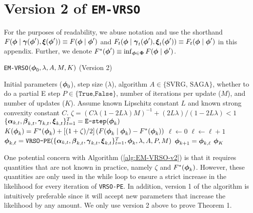 \section{Version 2 of \texttt{EM-VRSO}}

For the purposes of readability, we abuse notation and use the shorthand $F(\boldsymbol{\phi} \mid \boldsymbol{\gamma}(\boldsymbol{\phi}'), \boldsymbol{\xi}(\boldsymbol{\phi}')) \equiv F(\boldsymbol{\phi} \mid \boldsymbol{\phi}')$ and $F_{t}(\boldsymbol{\phi} \mid \boldsymbol{\gamma}_{t}(\boldsymbol{\phi}'), \boldsymbol{\xi}_{t}(\boldsymbol{\phi}')) \equiv F_{t}(\boldsymbol{\phi} \mid \boldsymbol{\phi}')$ in this appendix. Further, we denote $F^*(\boldsymbol{\phi}') \equiv \inf_{\boldsymbol{\phi} \in \boldsymbol{\Phi}} F(\boldsymbol{\phi} \mid \boldsymbol{\phi}')$.

\begin{algorithm}
\caption{\texttt{EM-VRSO}$(\boldsymbol{\phi}_0, \lambda, A, M, K)$ (Version 2)}\label{alg:EM-VRSO-v2}
\begin{algorithmic}[1]
\Require Initial parameters ($\boldsymbol{\phi}_{0}$), step size ($\lambda$), algorithm $A \in \{\text{SVRG, SAGA}\}$, whether to do a partial E step $P \in \{\texttt{True,False}\}$, number of iterations per update ($M$), and number of updates ($K$). Assume known Lipschitz constant $L$ and known strong convexity constant $C$.
%
\vspace{5pt}
%
\State $\zeta = (C \lambda(1-2L\lambda)M)^{-1} + (2L\lambda) / (1-2L\lambda) < 1$ 
%
%
% 
\State $\{\boldsymbol{\alpha}_{k,t},\boldsymbol{\beta}_{k,t},\boldsymbol{\gamma}_{k,t},\boldsymbol{\xi}_{k,t}\}_{t=1}^{T} = \texttt{E-step}(\boldsymbol{\phi}_{k})$ 
%
\State $K(\boldsymbol{\phi}_{k}) = F^{*}(\boldsymbol{\phi}_{k}) + \left[(1 + \zeta) / 2\right]\left(F(\boldsymbol{\phi}_{k} \mid \boldsymbol{\phi}_{k}) - F^{*}(\boldsymbol{\phi}_{k})\right)$
%
\State $\ell \gets 0$ 
%
\State $\ell \gets \ell+1$
\State $\boldsymbol{\phi}_{k,\ell} = \texttt{VRSO-PE}(\{\boldsymbol{\alpha}_{k,t},\boldsymbol{\beta}_{k,t},\boldsymbol{\gamma}_{k,t},\boldsymbol{\xi}_{k,t}\}_{t=1}^{T},\boldsymbol{\phi}_{k},\lambda,A,P,M)$
%
\EndWhile
\State $\boldsymbol{\phi}_{k+1} = \boldsymbol{\phi}_{k,\ell}$
\EndFor
\State \Return $\boldsymbol{\phi}_K$
\end{algorithmic}
\end{algorithm}

One potential concern with Algorithm (\ref{alg:EM-VRSO-v2}) is that it requires quantities that are not known in practice, namely $\zeta$ and $F^{*}(\boldsymbol{\phi}_{k})$. However, these quantities are only used in the while loop to ensure a strict increase in the likelihood for every iteration of \texttt{VRSO-PE}. In addition, version 1 of the algorithm is intuitively preferable since it will accept new parameters that increase the likelihood by any amount. We only use version 2 above to prove Theorem 1.

